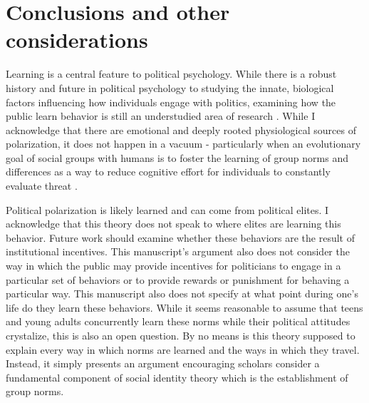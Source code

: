 \documentclass [12pt]{article}
\begin{document}
\section{Conclusions and other considerations}

Learning is a central feature to political psychology. While there is a robust history and future in political psychology to studying the innate, biological factors influencing how individuals engage with politics, examining how the public learn behavior is still an understudied area of research \citep{sapiro_2004}. While I acknowledge that there are emotional and deeply rooted physiological sources of polarization, it does not happen in a vacuum - particularly when an evolutionary goal of social groups with humans is to foster the learning of group norms and differences as a way to reduce cognitive effort for individuals to constantly evaluate threat \citep{sidanius_kurzban_2013}. 

Political polarization is likely learned and can come from political elites. I acknowledge that this theory does not speak to where elites are learning this behavior. Future work should examine whether these behaviors are the result of institutional incentives. This manuscript's argument also does not consider the way in which the public may provide incentives for politicians to engage in a particular set of behaviors or to provide rewards or punishment for behaving a particular way. This manuscript also does not specify at what point during one's life do they learn these behaviors. While it seems reasonable to assume that teens and young adults concurrently learn these norms while their political attitudes crystalize, this is also an open question. By no means is this theory supposed to explain every way in which norms are learned and the ways in which they travel. Instead, it simply presents an argument encouraging scholars consider a fundamental component of social identity theory which is the establishment of group norms. 
\end{document}
